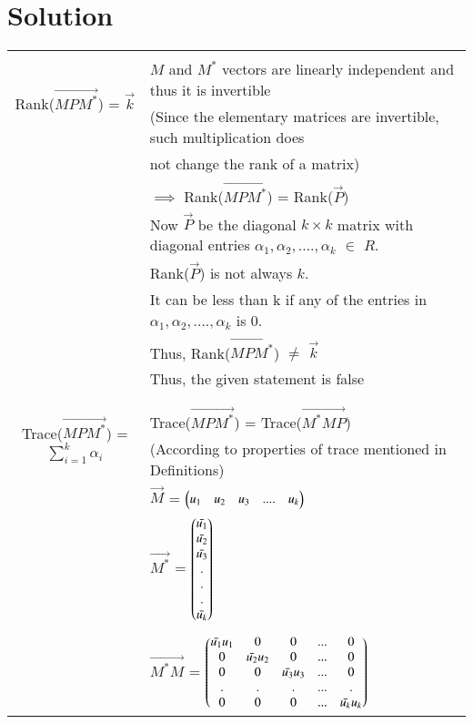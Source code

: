 \documentclass[journal,12pt]{IEEEtran}
\begin{document}
\section{\textbf{Solution}}
\renewcommand{\thetable}{2}
\begin{longtable}{|c|l|}
    \hline
	\multirow{3}{*}{Rank($\vec{MP{M}^*}$) = $\vec{k}$} 
	& \\
	& $M$ and $M^*$ vectors are linearly independent and thus it is invertible\\
	& (Since the elementary matrices are invertible, such multiplication does\\
	& not change the rank of a matrix)\\
	& $\implies$ Rank($\vec{MP{M}^*}$) = Rank($\vec{P}$) \\
	& Now $\vec{P}$ be the diagonal $k \times k$ matrix with diagonal entries $\alpha_1,\alpha_2,....,\alpha_k$ $\in$ $R$.\\
	& Rank($\Vec{P}$) is not always $k$. \\
	& It can be less than k if any of the entries in $\alpha_1,\alpha_2,....,\alpha_k$ is 0.\\
	& Thus, Rank($\vec{MP{M}^*}$) $\ne$ $\vec{k}$\\
	& Thus, the given statement is false\\
	&\\
	\hline
	\multirow{3}{*}{Trace($\vec{MP{M}^*}$) = $\sum_{i=1}^{k}\alpha_i$} & \\
	& Trace($\vec{MP{M}^*}$) = Trace($\vec{{M}^*MP}$)\\
	& (According to properties of trace mentioned in Definitions)\\
	& $\vec{M}$ = $\begin{pmatrix}u_1&u_2&u_3&....&u_k\end{pmatrix}$ \\
	& $\vec{M^*}$ = $\begin{pmatrix}\Bar{u_1}\\\Bar{u_2}\\\Bar{u_3}\\.\\.\\.\\\Bar{u_k}\end{pmatrix}$ \\
	&\\
	& $\vec{M^*M}$ = $\begin{pmatrix}\Bar{u_1}u_1&0&0&...&0\\
	                           0&\Bar{u_2}u_2&0&...&0\\
	                           0&0&\Bar{u_3}u_3&...&0\\
	                           .&.&.&...&.\\
	                           0&0&0&...&\Bar{u_k}u_k\end{pmatrix}$\\

\end{longtable}
\end{document}
